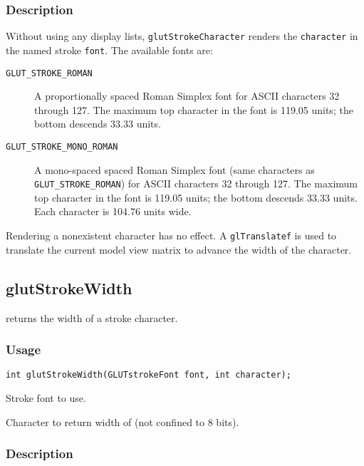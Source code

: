 \subsubsection*{Description}

Without using any display lists, {\tt glutStrokeCharacter} renders the {\tt character}
in the named stroke {\tt font}.  The available fonts are:
\begin{description}
\item[{{\tt GLUT\_STROKE\_ROMAN}}]
A proportionally spaced Roman Simplex font
for ASCII characters 32 through 127.  The maximum top character in the font
is 119.05 units; the bottom descends 33.33 units.

\item[{{\tt GLUT\_STROKE\_MONO\_ROMAN}}]
A mono-spaced spaced Roman Simplex font (same characters as {\tt GLUT\_STROKE\_ROMAN})
for ASCII characters 32 through 127.  The maximum top character in the font
is 119.05 units; the bottom descends 33.33 units.  Each character is 104.76
units wide.
\end{description}

Rendering a nonexistent character has no effect.  A {\tt glTranslatef} is used
to translate the current model view matrix to advance the width of the
character.

\subsection{glutStrokeWidth}

 returns the width of a stroke character.

\subsubsection*{Usage}
\begin{verbatim}
int glutStrokeWidth(GLUTstrokeFont font, int character);
\end{verbatim}
\begin{description}
\itemsep 0in
\item[{\tt font}]
Stroke font to use.
\item[{\tt character}]
Character to return width of (not confined to 8 bits).
\end{description}

\subsubsection*{Description}

